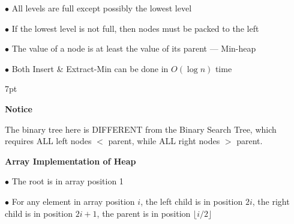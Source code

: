\documentclass[10pt]{article}
\newenvironment{formal}[2]{%
	\def\FrameCommand{%
		\hspace{1pt}%
		{\color{#1}\vrule width 2pt}%
		{\color{#2}\vrule width 4pt}%
		\colorbox{#2}%
	}%
	\MakeFramed{\advance\hsize-\width\FrameRestore}%
	\noindent\hspace{-4.55pt}%
	\begin{adjustwidth}{}{7pt}%
		\vspace{2pt}\vspace{2pt}%
	}
	{%
		\vspace{2pt}\end{adjustwidth}\endMakeFramed%
}
\begin{document}
$\bullet$ All levels are full except possibly the lowest level

$\bullet$ If the lowest level is not full, then nodes must be packed to 
the left

$\bullet$ The value of a node is at least the value of its parent — Min-heap

$\bullet$ Both Insert \& Extract-Min can be done in $O(\log n)$ time

\begin{formal}{DarkBlue}{blueshade}
	
	\textbf{Notice}
	
	The binary tree here is DIFFERENT from the Binary Search Tree, which requires ALL left nodes $<$ parent, while ALL right nodes $>$ parent.
	
\end{formal}

\textbf{Array Implementation of Heap}

$\bullet$ The root is in array position 1

$\bullet$ For any element in array position $i$, the left child is in position $2i$, the right child is in position $2i+1$, the parent is in position $\lfloor i/2 \rfloor$
\end{document}
